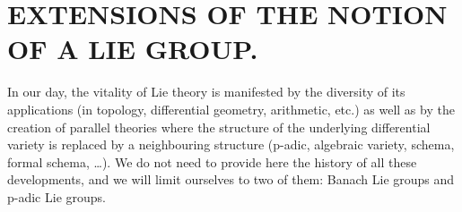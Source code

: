 \section{EXTENSIONS OF THE NOTION OF A LIE GROUP.}

In our day, the vitality of Lie theory is manifested by the diversity of its applications (in topology, differential geometry, arithmetic, etc.) as well as by the creation of parallel theories where the structure of the underlying differential variety is replaced by a neighbouring structure (p-adic, algebraic variety, schema, formal schema, \ldots). We do not need to provide here the history of all these developments, and we will limit ourselves to two of them: Banach Lie groups and p-adic Lie groups.


